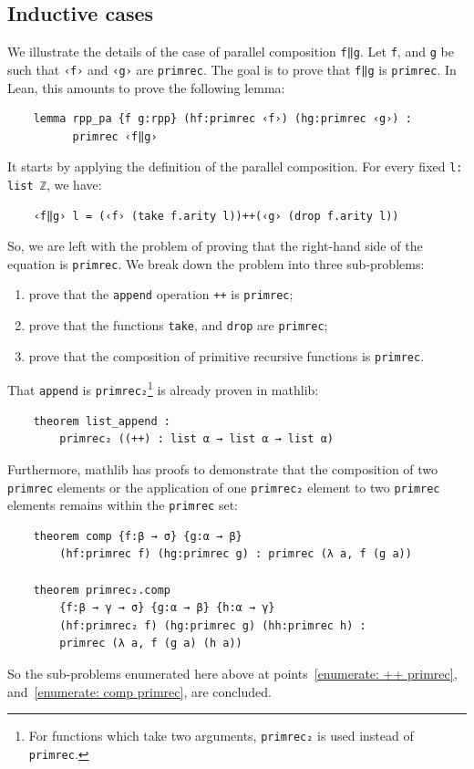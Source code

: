 \documentclass[preprint]{elsarticle}
\theoremstyle{remark}
\newcommand{\MATHLIB}{\textsf{mathlib}\xspace}
\newcommand{\LEAN}{\textsf{Lean}\xspace}
\begin{document}
\subsection{Inductive cases}
We illustrate the details of the case of parallel composition \lstinline|f‖g|. Let \lstinline|f|, and \lstinline|g| be such that \lstinline|‹f›| and \lstinline|‹g›| are \lstinline|primrec|. The goal is to prove that \lstinline|f‖g| is \lstinline|primrec|. In \LEAN, this amounts to prove the following lemma:
\begin{lstlisting}
    lemma rpp_pa {f g:rpp} (hf:primrec ‹f›) (hg:primrec ‹g›) :
          primrec ‹f‖g›
\end{lstlisting}
\noindent
It starts by applying the definition of the parallel composition. For every fixed \lstinline|l: list ℤ|, we have:
\begin{lstlisting}
    ‹f‖g› l = (‹f› (take f.arity l))++(‹g› (drop f.arity l))
\end{lstlisting}
\noindent
So, we are left with the problem of proving that the right-hand side of the equation is \lstinline|primrec|. We break down the problem into three sub-problems:
\begin{enumerate}
    \item \label{enumerate: ++ primrec}
    prove that the \lstinline|append| operation \lstinline|++| is \lstinline|primrec|;
    \item \label{enumerate: drop primrec}
    prove that the functions \lstinline|take|, and \lstinline|drop| are \lstinline|primrec|;
    \item \label{enumerate: comp primrec}
    prove that the composition of primitive recursive functions is \lstinline|primrec|.
\end{enumerate}
\noindent
That \lstinline|append| is \lstinline|primrec₂|\footnote{For functions which take two arguments, \lstinline|primrec₂| is used instead of \lstinline|primrec|.} is already proven in \MATHLIB:
\begin{lstlisting}
    theorem list_append :
        primrec₂ ((++) : list α → list α → list α)
\end{lstlisting}
\noindent
Furthermore, \MATHLIB has proofs to demonstrate that the composition of two \lstinline|primrec| elements or the application of one \lstinline|primrec₂| element to two \lstinline|primrec| elements remains within the \lstinline|primrec| set:
\begin{lstlisting}
    theorem comp {f:β → σ} {g:α → β}
        (hf:primrec f) (hg:primrec g) : primrec (λ a, f (g a))

    theorem primrec₂.comp
        {f:β → γ → σ} {g:α → β} {h:α → γ}
        (hf:primrec₂ f) (hg:primrec g) (hh:primrec h) :
        primrec (λ a, f (g a) (h a))
\end{lstlisting}
\noindent
So the sub-problems enumerated here above at points~\ref{enumerate: ++ primrec}, and~\ref{enumerate: comp primrec}, are concluded.
\end{document}
